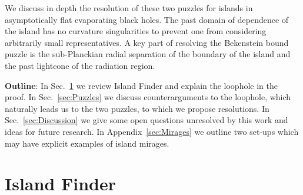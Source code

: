 \documentclass[a4paper,11pt]{article}
\newcommand{\del}{\partial}
\begin{document}
We discuss in depth the resolution of these two puzzles for islands in asymptotically flat evaporating black holes. The past domain of dependence of the island has no curvature singularities to prevent one from considering arbitrarily small representatives. A key part of resolving the Bekenstein bound puzzle is the sub-Planckian radial separation of the boundary of the island and the past lightcone of the radiation region.


\textbf{Outline}: In Sec.~\ref{sec:IslandFinder} we review Island Finder and explain the loophole in the proof. In Sec.~\ref{sec:Puzzles} we discuss counterarguments to the loophole, which naturally leads us to the two puzzles, to which we propose resolutions. In Sec.~\ref{sec:Discussion} we give some open questions unresolved by this work and ideas for future research. In Appendix~\ref{sec:Mirages} we outline two set-ups which may have explicit examples of island mirages. 

\section{Island Finder}\label{sec:IslandFinder}
\end{document}
